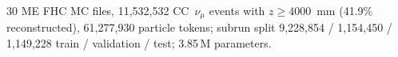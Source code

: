 30 ME FHC MC files, 11{,}532{,}532 CC~$\nu_\mu$ events with $z \ge 4000$~mm (41.9\% reconstructed), 61{,}277{,}930 particle tokens; subrun split 9{,}228{,}854 / 1{,}154{,}450 / 1{,}149{,}228 train / validation / test; 3.85\,M parameters.
